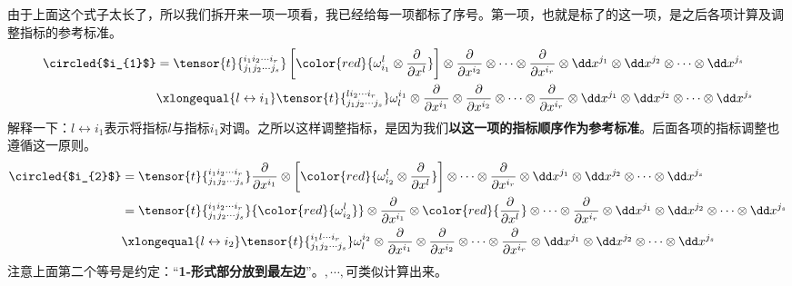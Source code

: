 由于上面这个式子太长了，所以我们拆开来一项一项看，我已经给每一项都标了序号。第一项，也就是标了\circled{$\star$}的这一项，是之后各项计算及调整指标的参考标准。
\[
\begin{split}
\circled{$i_{1}$}&=\tensor{t}{^{i_{1}i_{2}\cdots i_{r}}_{j_{1}j_{2}\cdots j_{s}}}\left[{\color{red}{\omega_{i_{1}}^{l}\otimes\frac { \partial } { \partial x ^ { l} }}}\right]\otimes\frac { \partial } { \partial x ^ { i_{2} } }\otimes\cdots\otimes\frac { \partial } { \partial x ^ { i_{r} } }\otimes\dd x^{j_{1}}\otimes\dd x^{j_{2}}\otimes\cdots\otimes\dd x^{j_{s}} \\
&\xlongequal{l\leftrightarrow i_{1}}\tensor{t}{^{li_{2}\cdots i_{r}}_{j_{1}j_{2}\cdots j_{s}}}\omega_{l}^{i_{1}}\otimes\frac { \partial } { \partial x ^ { i_{1}} }\otimes\frac { \partial } { \partial x ^ { i_{2} } }\otimes\cdots\otimes\frac { \partial } { \partial x ^ { i_{r} } }\otimes\dd x^{j_{1}}\otimes\dd x^{j_{2}}\otimes\cdots\otimes\dd x^{j_{s}} 
\end{split}
\]
解释一下：$l\leftrightarrow i_{1}$表示将指标$l$与指标$i_{1}$对调。之所以这样调整指标，是因为我们\textbf{以\circled{$\star$}这一项的指标顺序作为参考标准}。后面各项的指标调整也遵循这一原则。
\[
\begin{split}
\circled{$i_{2}$}&=\tensor{t}{^{i_{1}i_{2}\cdots i_{r}}_{j_{1}j_{2}\cdots j_{s}}}\frac { \partial } { \partial x ^ { i_{1} } }\otimes \left[{\color{red}{\omega_{i_{2}}^{l}\otimes\frac { \partial } { \partial x ^ { l} }}}\right]\otimes\cdots\otimes\frac { \partial } { \partial x ^ { i_{r} } }\otimes\dd x^{j_{1}}\otimes\dd x^{j_{2}}\otimes\cdots\otimes\dd x^{j_{s}}\\
&=\tensor{t}{^{i_{1}i_{2}\cdots i_{r}}_{j_{1}j_{2}\cdots j_{s}}}{\color{red}{\omega_{i_{2}}^{l}}}\otimes\frac { \partial } { \partial x ^ { i_{1} } }\otimes {\color{red}{\frac { \partial } { \partial x ^ { l} }}}\otimes\cdots\otimes\frac { \partial } { \partial x ^ { i_{r} } }\otimes\dd x^{j_{1}}\otimes\dd x^{j_{2}}\otimes\cdots\otimes\dd x^{j_{s}}\\
&\xlongequal{l\leftrightarrow i_{2}}\tensor{t}{^{i_{1}l\cdots i_{r}}_{j_{1}j_{2}\cdots j_{s}}}\omega_{l}^{i_{2}}\otimes\frac { \partial } { \partial x ^ { i_{1} } }\otimes \frac { \partial } { \partial x ^ { i_{2}} }\otimes\cdots\otimes\frac { \partial } { \partial x ^ { i_{r} } }\otimes\dd x^{j_{1}}\otimes\dd x^{j_{2}}\otimes\cdots\otimes\dd x^{j_{s}}
\end{split}
\]
注意上面第二个等号是约定：“\textbf{1-形式部分放到最左边}”。$,\cdots,$可类似计算出来。

